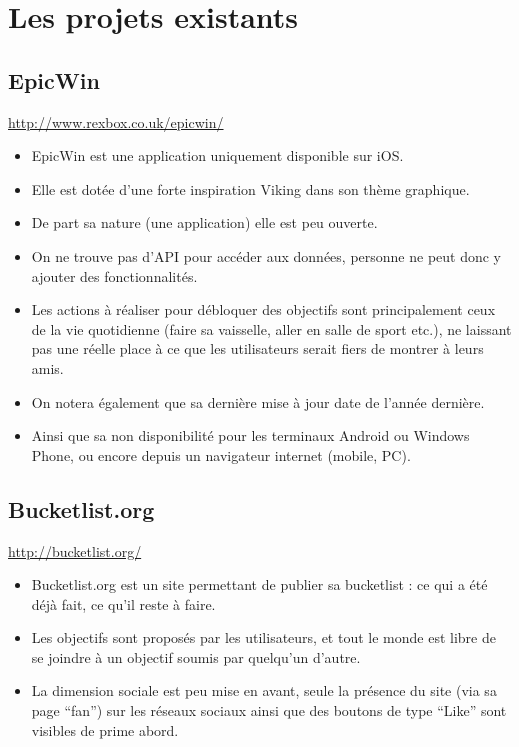 \documentclass{life-fr}
\begin{document}
\chapter{Les projets existants}

\section{EpicWin}
\url{http://www.rexbox.co.uk/epicwin/}\\

\begin{itemize}

  \item EpicWin est une application uniquement disponible sur iOS.
  \item Elle est dotée d'une forte inspiration Viking dans son thème graphique.
  \item De part sa nature (une application) elle est peu ouverte.
  \item On ne trouve pas d'API pour accéder aux données, personne ne peut donc y ajouter des fonctionnalités.
  \item Les actions à réaliser pour débloquer des objectifs sont principalement ceux de la vie quotidienne (faire sa vaisselle, aller en salle de sport etc.), ne laissant pas une réelle place à ce que les utilisateurs serait fiers de montrer à leurs amis.
  \item On notera également que sa dernière mise à jour date de l'année dernière.
  \item Ainsi que sa non disponibilité pour les terminaux Android ou Windows Phone, ou encore depuis un navigateur internet (mobile, PC).
\end{itemize}

\section{Bucketlist.org}
\url{http://bucketlist.org/}

\begin{itemize}
  \item Bucketlist.org est un site permettant de publier sa bucketlist : ce qui a été déjà fait, ce qu'il reste à faire.
  \item Les objectifs sont proposés par les utilisateurs, et tout le monde est libre de se joindre à un objectif soumis par quelqu'un d'autre.
  \item La dimension sociale est peu mise en avant, seule la présence du site (via sa page ``fan'') sur les réseaux sociaux ainsi que des boutons de type ``Like'' sont visibles de prime abord.
\end{itemize}
\end{document}
